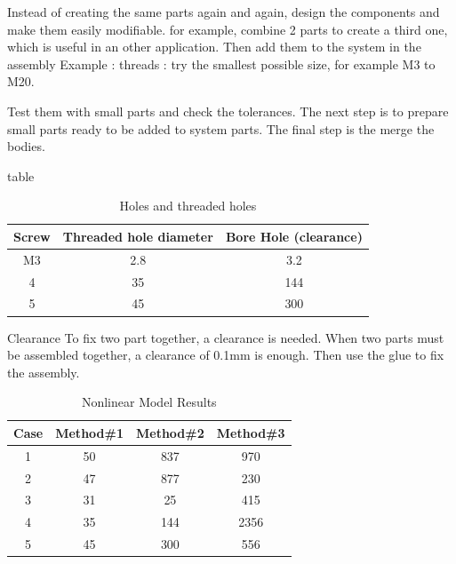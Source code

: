 \documentclass[12pt,a4paper]{article}
\begin{document}
	Instead of creating the same parts again and again, design the components and make them easily modifiable.
	for example, combine 2 parts to create a third one, which is useful in an other application. Then add them to the system in the assembly
	Example : threads : try the smallest possible size, for example M3 to M20. 
	
	Test them with small parts and check the tolerances. 
	The next step is to prepare small parts ready to be added to system parts. The final step is the merge the bodies. 
	
	
	table
	
	\begin{table}[ht]
		\caption{Holes and threaded holes} %
		\centering %
		\begin{tabular}{c c c} %
			\hline\hline %
			Screw & Threaded hole diameter & Bore Hole (clearance) \\ [0.5ex] %
			\hline %
			M3 & 2.8 & 3.2 \\ %
			4 & 35 & 144 \\
			5 & 45 & 300 \\ [1ex] %
			\hline %
		\end{tabular}\label{table:nonlin} %
	\end{table}
	
	Clearance
	To fix two part together, a clearance is needed.
	When two parts must be assembled together, a clearance of 0.1mm is enough. Then use the glue to fix the assembly. 
	
	
	
	\begin{table}[ht]
		\caption{Nonlinear Model Results} %
		\centering %
		\begin{tabular}{c c c c} %
			\hline\hline %
			Case & Method\#1 & Method\#2 & Method\#3 \\ [0.5ex] %
			\hline %
			1 & 50 & 837 & 970 \\ %
			2 & 47 & 877 & 230 \\
			3 & 31 & 25 & 415 \\
			4 & 35 & 144 & 2356 \\
			5 & 45 & 300 & 556 \\ [1ex] %
			\hline %
		\end{tabular}\label{table:nonlin} %
	\end{table}
	
\end{document}
